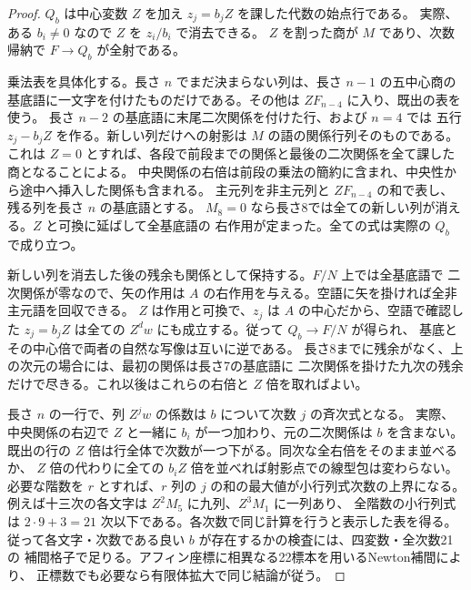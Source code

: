 \begin{proof}
$Q_b$ は中心変数 $Z$ を加え $z_j=b_j Z$ を課した代数の始点行である。
実際、ある $b_i\ne0$ なので $Z$ を $z_i/b_i$ で消去できる。
$Z$ を割った商が $M$ であり、次数帰納で $F\to Q_b$ が全射である。

乗法表を具体化する。長さ $n$ でまだ決まらない列は、長さ $n-1$ の五中心商の
基底語に一文字を付けたものだけである。その他は $Z F_{n-4}$ に入り、既出の表を使う。
長さ $n-2$ の基底語に末尾二次関係を付けた行、および $n=4$ では
五行 $z_j-b_j Z$ を作る。新しい列だけへの射影は $M$ の語の関係行列そのものである。
これは $Z=0$ とすれば、各段で前段までの関係と最後の二次関係を全て課した商となることによる。
中央関係の右倍は前段の乗法の簡約に含まれ、中央性から途中へ挿入した関係も含まれる。
主元列を非主元列と $Z F_{n-4}$ の和で表し、残る列を長さ $n$ の基底語とする。
$M_8=0$ なら長さ8では全ての新しい列が消える。$Z$ と可換に延ばして全基底語の
右作用が定まった。全ての式は実際の $Q_b$ で成り立つ。

新しい列を消去した後の残余も関係として保持する。$F/N$ 上では全基底語で
二次関係が零なので、矢の作用は $A$ の右作用を与える。空語に矢を掛ければ全非主元語を回収できる。
$Z$ は作用と可換で、$z_j$ は $A$ の中心だから、空語で確認した
$z_j=b_j Z$ は全ての $Z^d w$ にも成立する。従って $Q_b\to F/N$ が得られ、
基底とその中心倍で両者の自然な写像は互いに逆である。
長さ8までに残余がなく、上の次元の場合には、最初の関係は長さ7の基底語に
二次関係を掛けた九次の残余だけで尽きる。これ以後はこれらの右倍と $Z$ 倍を取ればよい。

長さ $n$ の一行で、列 $Z^j w$ の係数は $b$ について次数 $j$ の斉次式となる。
実際、中央関係の右辺で $Z$ と一緒に $b_i$ が一つ加わり、元の二次関係は $b$ を含まない。
既出の行の $Z$ 倍は行全体で次数が一つ下がる。同次な全右倍をそのまま並べるか、
$Z$ 倍の代わりに全ての $b_iZ$ 倍を並べれば射影点での線型包は変わらない。
必要な階数を $r$ とすれば、$r$ 列の $j$ の和の最大値が小行列式次数の上界になる。
例えば十三次の各文字は $Z^2 M_5$ に九列、$Z^3 M_1$ に一列あり、
全階数の小行列式は $2\cdot9+3=21$ 次以下である。各次数で同じ計算を行うと表示した表を得る。
従って各文字・次数である良い $b$ が存在するかの検査には、四変数・全次数21の
補間格子で足りる。アフィン座標に相異なる22標本を用いるNewton補間により、
正標数でも必要なら有限体拡大で同じ結論が従う。
\end{proof}


